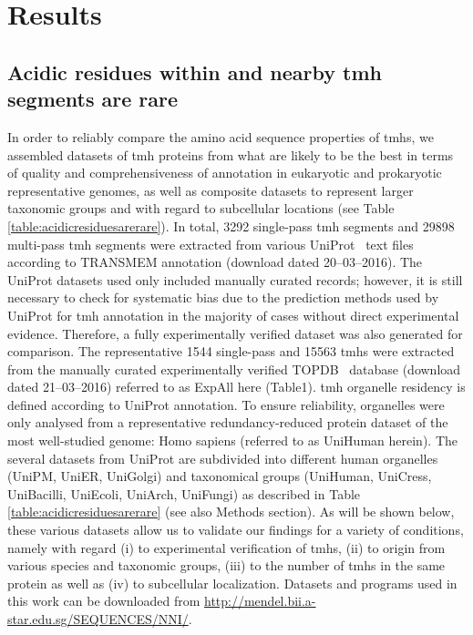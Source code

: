 \section{Results}

\subsection{Acidic residues within and nearby \gls{tmh} segments are rare}

In order to reliably compare the amino acid sequence properties of \gls{tmh}s, we assembled datasets of \gls{tmh} proteins from what are likely to be the best in terms of quality and comprehensiveness of annotation in eukaryotic and prokaryotic representative genomes, as well as composite datasets to represent larger taxonomic groups and with regard to subcellular locations (see Table \ref{table:acidicresiduesarerare}). In total, 3292 single-pass \gls{tmh} segments and 29898 multi-pass \gls{tmh} segments were extracted from various UniProt~\cite{TheUniProtConsortium2014} text files according to TRANSMEM annotation (download dated 20--03--2016). The UniProt datasets used only included manually curated records; however, it is still necessary to check for systematic bias due to the prediction methods used by UniProt for \gls{tmh} annotation in the majority of cases without direct experimental evidence. Therefore, a fully experimentally verified dataset was also generated for comparison. The representative 1544 single-pass and 15563 \gls{tmh}s were extracted from the manually curated experimentally verified TOPDB~\cite{Dobson2015} database (download dated 21--03--2016) referred to as ExpAll here (Table1). \gls{tmh} organelle residency is defined according to UniProt annotation. To ensure reliability, organelles were only analysed from a representative redundancy-reduced protein dataset of the most well-studied genome: Homo sapiens (referred to as UniHuman herein). The several datasets from UniProt  are subdivided into different human organelles (UniPM, UniER, UniGolgi) and taxonomical groups (UniHuman, UniCress, UniBacilli, UniEcoli, UniArch, UniFungi) as described in Table \ref{table:acidicresiduesarerare} (see also Methods section). As will be shown below, these various datasets allow us to validate our findings for a variety of conditions, namely with regard (i) to experimental verification of \gls{tmh}s, (ii) to origin from various species and taxonomic groups, (iii) to the number of \gls{tmh}s in the same protein as well as (iv) to subcellular localization. Datasets and programs used in this work can be downloaded from \url{http://mendel.bii.a-star.edu.sg/SEQUENCES/NNI/}.

